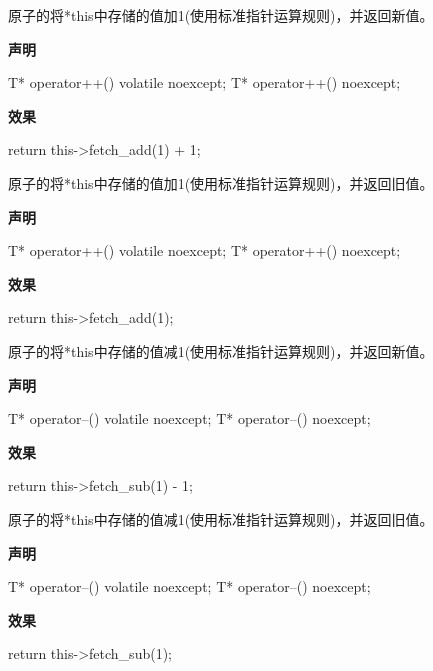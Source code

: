 原子的将*this中存储的值加1(使用标准指针运算规则)，并返回新值。

\textbf{声明}

\begin{cpp}
T* operator++() volatile noexcept;
T* operator++() noexcept;
\end{cpp}

\textbf{效果}

\begin{cpp}
return this->fetch_add(1) + 1;
\end{cpp}


原子的将*this中存储的值加1(使用标准指针运算规则)，并返回旧值。

\textbf{声明}

\begin{cpp}
T* operator++() volatile noexcept;
T* operator++() noexcept;
\end{cpp}

\textbf{效果}

\begin{cpp}
return this->fetch_add(1);
\end{cpp}


原子的将*this中存储的值减1(使用标准指针运算规则)，并返回新值。

\textbf{声明}

\begin{cpp}
T* operator--() volatile noexcept;
T* operator--() noexcept;
\end{cpp}

\textbf{效果}

\begin{cpp}
return this->fetch_sub(1) - 1;
\end{cpp}


原子的将*this中存储的值减1(使用标准指针运算规则)，并返回旧值。

\textbf{声明}

\begin{cpp}
T* operator--() volatile noexcept;
T* operator--() noexcept;
\end{cpp}

\textbf{效果}

\begin{cpp}
return this->fetch_sub(1);
\end{cpp}

